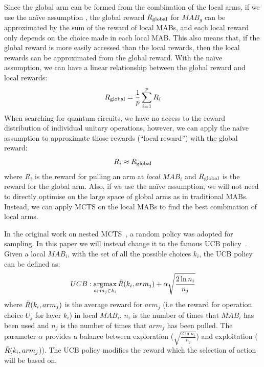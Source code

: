 \documentclass[a4paper,onecolumn,11pt]{quantumarticle}
\DeclareMathOperator*{\argmax}{argmax}
\begin{document}
Since the global arm can be formed from the combination of the local arms, if we use the na\"ive assumption \cite{CMAB_RTS}, the global reward $R_{\rm global}$ for $MAB_g$ can be approximated by the sum of the reward of local MABs, and each local reward only depends on the choice made in each local MAB. This also means that, if the global reward is more easily accessed than the local rewards, then the local rewards can be approximated from the global reward. With the na\"ive assumption, we can have a linear relationship between the global reward and local rewards:
\begin{equation}
    R_{\rm global} = \frac{1}{p}\sum_{i=1}^p R_i
\end{equation}
When searching for quantum circuits, we have no access to the reward distribution of individual unitary operations, however, we can apply the na\"ive assumption to approximate those rewards (``local reward'') with the global reward: 
\begin{equation}
    R_{i} \approx R_{\rm global}
\end{equation}
where $R_{i}$ is the reward for pulling an arm at \textit{local $MAB_i$} and $R_{\rm global}$ is the reward for the global arm.
Also, if we use the na\"ive assumption, we will not need to directly optimise on the large space of global arms as in  traditional MABs. Instead, we can apply MCTS on the local MABs to find the best combination of local arms.

In the original work on nested MCTS~\cite{nestedmontecarlosearch}, a random policy was adopted for sampling. In this paper we will instead change it to the famous UCB policy~\cite{UCB_paper_10.5555/944919.944941}. Given a local $MAB_i$, with the set of all the possible choices $k_i$, the UCB policy can be defined as:
\begin{equation}
    UCB: \argmax_{arm_j\in k_i} \Bar{R}(k_i, arm_j) + \alpha \sqrt{\frac{2\ln n_i}{n_j}}
\end{equation}
where $\Bar{R}(k_i, arm_j)$ is the average reward for $arm_j$ (i.e the reward for operation choice $U_j$  for layer $k_i$) in local $MAB_i$, $n_i$ is the number of times that $MAB_i$ has been used and $n_j$ is the number of times that $arm_j$ has been pulled. The parameter $\alpha$ provides a balance between exploration ($\sqrt{\frac{2\ln n_i}{n_j}}$) and exploitation ($\Bar{R}(k_i, arm_j$)). The UCB policy modifies the reward which the selection of action will be based on. 
\end{document}
